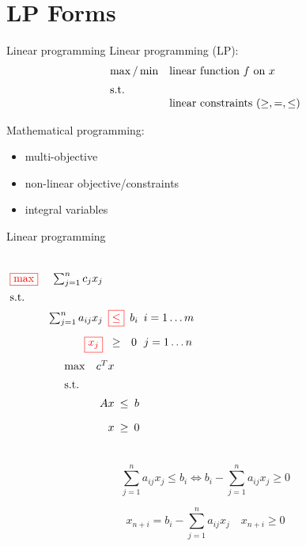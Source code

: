 \section{LP Forms}

\begin{frame}{Linear programming}
  Linear programming (LP):
  \begin{equation*}
	\setlength\arraycolsep{2.5pt}
	\begin{array}{l@{\quad}l}
	  \max/\min 	& \text{linear function } f \text{ on } x	\\[5pt]
	  \text{s.t.} 	&	\\
					&	\text{linear constraints } (\geq, =, \leq)
	\end{array}
  \end{equation*}

  \vspace{0.80cm}

  Mathematical programming:
  \begin{itemize}
	\item multi-objective
	\item non-linear objective/constraints
	\item integral variables
  \end{itemize}
\end{frame}
\begin{frame}{Linear programming}
  \begin{columns}
	  \begin{equation*}
		\setlength\arraycolsep{2.5pt}
		\begin{array}{l@{\quad}rccl}
		  \red{\boxed{\max}} 	& \sum_{j=1}^{n} c_j x_j 	&	&	&	\\[5pt]
		  \text{s.t.} 	&	&	&	&	\\[5pt]
		  &	\sum_{j=1}^{n} a_{ij} x_j &	\red{\boxed{\leq}}	&	b_i	&	i = 1 \dots m \\[10pt]
		  &	\red{\boxed{x_j}} 		& \geq 	&	0	&	j = 1 \dots n
		\end{array}
	  \end{equation*}
	  \begin{equation*}
		\setlength\arraycolsep{2.5pt}
		\begin{array}{l@{\quad}rcc}
		  \max 	& c^{T}x	&	&	\\[5pt]
		  \text{s.t.} 	&	&	&	\\[5pt]
				&	Ax 	&	\leq	&	b	\\[10pt]
				&	x	& 	\geq 	&	0	
		\end{array}
	  \end{equation*}
  \end{columns}

  \vspace{0.50cm}

  \[
	\sum_{j=1}^{n} a_{ij} x_j \leq b_i	\iff b_i - \sum_{j=1}^{n} a_{ij} x_j \geq 0
  \]

  \[
	x_{n+i} = b_i - \sum_{j=1}^{n} a_{ij} x_j \quad x_{n+i} \geq 0
  \]
\end{frame}
